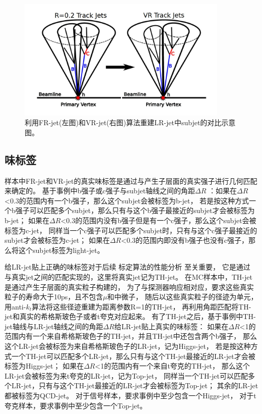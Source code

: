 \begin{figure}
  \begin{center}
    \includegraphics[width=0.9\textwidth]{figuresEXP/ATLASJET2.jpg}
  \end{center}
  \caption{
利用FR-jet(左图)和VR-jet(右图)算法重建LR-jet中subjet的对比示意图。
  }
    \label{fig:ATLASJET2}
\end{figure}


\subsection{味标签}
\label{sec:XbbORFT}

样本中FR-jet和VR-jet的真实味标签是通过与产生子层面的真实强子进行几何匹配来确定的。
基于事例中b强子或c强子与subjet轴线之间的角距$\Delta R$
：如果在$\Delta R$<0.3的范围内有一个b强子，那么这个subjet会被标签为b-jet，
若是按这种方式一个b强子可以匹配多个subjet，那么只有与这个b强子最接近的subjet才会被标签为b-jet；
如果在$\Delta R$<0.3的范围内没有b强子但是有一个c强子，那么这个subjet会被标签为c-jet，
同样当一个c强子可以匹配多个subjet时，只有与这个c强子最接近的subjet才会被标签为c-jet；
如果在$\Delta R$<0.3的范围内即没有b强子也没有c强子，那么将这个subjet标签为light-jet。

给LR-jet贴上正确的味标签对于后续
标定算法的性能分析
至关重要，
它是通过
与真实jet之间的匹配实现的，这里将真实jet记为TH-jet。
在MC样本中，TH-jet是通过产生子层面的真实粒子构建的，
为了与探测器响应相对应，要求这些真实粒子的寿命大于10ps，且不包含$\mu$和中微子，
随后以这些真实粒子的径迹为单元，
用anti-$k_t$算法将这些径迹重建为距离参数R=1的TH-jet，
再利用角距匹配将TH-jet和真实的希格斯玻色子或者t夸克对应起来。
有了TH-jet之后，基于事例中TH-jet轴线与LR-jet轴线之间的角距$\Delta R$给LR-jet贴上真实的味标签：
如果在$\Delta R$<1的范围内有一个来自希格斯玻色子的TH-jet，并且TH-jet中还包含两个b强子，
那么这个LR-jet会被标签为来自希格斯玻色子的LR-jet，记为Higgs-jet，
若是按这种方式一个TH-jet可以匹配多个LR-jet，那么只有与这个TH-jet最接近的LR-jet才会被标签为Higgs-jet；
如果在$\Delta R$<1的范围内有一个来自t夸克的TH-jet，
那么这个LR-jet会被标签为来t夸克的LR-jet，记为Top-jet，
同样当一个TH-jet可以匹配多个LR-jet，只有与这个TH-jet最接近的LR-jet才会被标签为Top-jet；
其余的LR-jet都被标签为QCD-jet。
对于信号样本，要求事例中至少包含一个Higgs-jet，
对于t夸克样本，要求事例中至少包含一个Top-jet。

